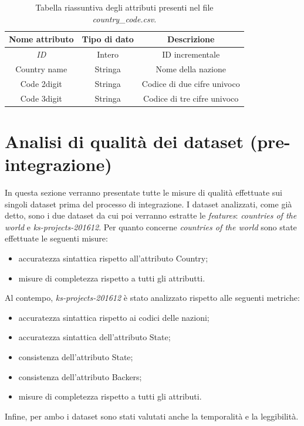\begin{table}
	\caption{Tabella riassuntiva degli attributi presenti nel file \textit{country\_code.csv}.}
	
	\label{tab:code}
	
	\centering
	\begin{tabular}{|c|c|c|}
		\hline
		\textbf{Nome attributo} & \textbf{Tipo di dato} & \textbf{Descrizione} \\ 
		\hline  
		\rule{0pt}{13pt}\emph{ID} & Intero & ID incrementale \\ 
		\hline  
		\rule{0pt}{13pt}Country name & Stringa & Nome della nazione \\ 
		\hline  
		\rule{0pt}{13pt}Code 2digit & Stringa & Codice di due cifre univoco \\ 
		\hline  
		\rule{0pt}{13pt}Code 3digit & Stringa & Codice di tre cifre univoco \\ 
		\hline   
	\end{tabular}
\end{table} 

\section{Analisi di qualità dei dataset (pre-integrazione)}
In questa sezione verranno presentate tutte le misure di qualità effettuate sui singoli dataset prima del processo di integrazione.
I dataset analizzati, come già detto, sono i due dataset da cui poi verranno estratte le \textit{features}: \textit{countries of the world} e \textit{ks-projects-201612}.
Per quanto concerne \textit{countries of the world} sono state effettuate le seguenti misure:
\begin{itemize}
	\item accuratezza sintattica rispetto all'attributo Country;
	\item misure di completezza rispetto a tutti gli attributti.
\end{itemize}
Al contempo, \textit{ks-projects-201612} è stato analizzato rispetto alle seguenti metriche:
\begin{itemize}
	\item accuratezza sintattica rispetto ai codici delle nazioni;
	\item accuratezza sintattica dell'attributo State;
	\item consistenza dell'attributo State;
	\item consistenza dell'attributo Backers;
	\item misure di completezza rispetto a tutti gli attributi.
\end{itemize}
Infine, per ambo i dataset sono stati valutati anche la temporalità e la leggibilità.

